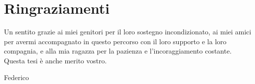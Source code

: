 \chapter*{Ringraziamenti}

Un sentito grazie ai miei genitori per il loro sostegno incondizionato, 
ai miei amici per avermi accompagnato in questo percorso con il loro supporto
e la loro compagnia, e alla mia ragazza per la pazienza
e l'incoraggiamento costante. Questa tesi è anche merito vostro.

\vspace{17mm}

\vs
\begin{flushright}
 Federico
\end{flushright}

